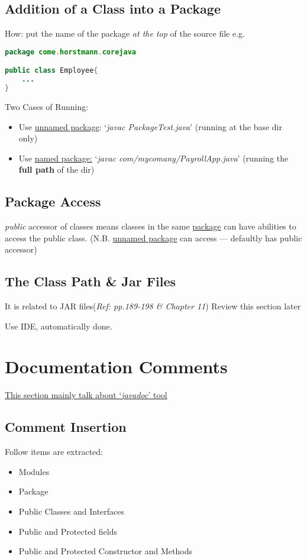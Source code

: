 \documentclass[12pt]{article}
\begin{document}
\subsection{Addition of a Class into a Package}
How: put the name of the package \textit{at the top} of the source file\newline
e.g.
\begin{lstlisting}[language=Java]
package come.horstmann.corejava

public class Employee{
    ... 
}
\end{lstlisting}

Two Cases of Running:
\begin{itemize}
    \item Use \underline{unnamed package}: `\emph{javac PackageTest.java}' \newline
    (running at the base dir only)
    \item Use \underline{named package:} `\emph{javac com/mycomany/PayrollApp.java}' \newline
    (running the \textbf{full path} of the dir)
\end{itemize}

\subsection{Package Access}
\emph{public} accessor of classes means classes in the same \underline{package} can have abilities to access
the public class. \newline
(N.B. \underline{unnamed package} can access --- defaultly has public accessor)

\subsection{The Class Path \& Jar Files}
It is related to JAR files(\textit{Ref: pp.189-198 \& Chapter 11}) \newline
Review this section later

Use IDE, automatically done.

\section{Documentation Comments}
\underline{This section mainly talk about `\emph{javadoc}' tool}

\subsection{Comment Insertion}
Follow items are extracted:
\begin{itemize}
    \item Modules
    \item Package
    \item Public Classes and Interfaces
    \item Public and Protected fields
    \item Public and Protected Constructor and Methods
\end{itemize}
\end{document}
